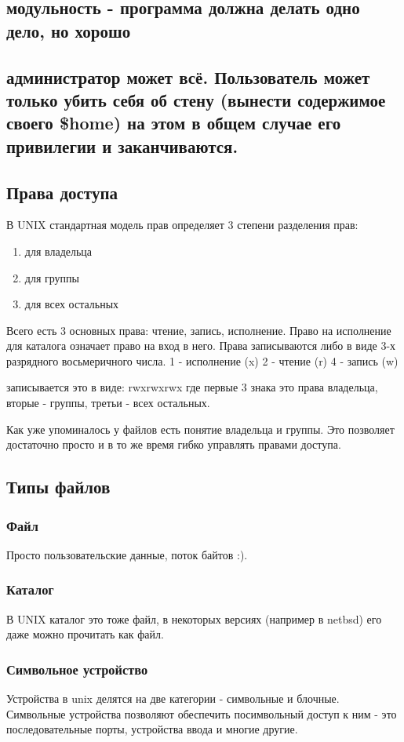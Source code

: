\subsection{модульность - программа должна делать одно дело, но хорошо}
\subsection{администратор может всё. Пользователь может только убить себя об стену (вынести содержимое своего \$home) на этом в общем случае его привилегии и заканчиваются.}
\subsection{Права доступа}
В UNIX стандартная модель прав определяет 3 степени разделения прав:
\begin{enumerate}
\item для владельца
\item для группы
\item для всех остальных
\end{enumerate}
Всего есть 3 основных права: чтение, запись, исполнение. Право на исполнение для каталога означает право на вход в него. Права записываются либо в виде 3-х разрядного восьмеричного числа.
1 - исполнение (x)
2 - чтение (r)
4 - запись (w)

записывается это в виде: rwxrwxrwx где первые 3 знака это права владельца, вторые - группы, третьи - всех остальных.

Как уже упоминалось у файлов есть понятие владельца и группы. Это позволяет достаточно просто и в то же время гибко управлять правами доступа.
\subsection{Типы файлов}
\subsubsection{Файл}
Просто пользовательские данные, поток байтов :).
\subsubsection{Каталог}
В UNIX каталог это тоже файл, в некоторых версиях (например в netbsd) его даже можно прочитать как файл.
\subsubsection{Символьное устройство}
Устройства в unix делятся на две категории - символьные и блочные. Символьные устройства позволяют обеспечить посимвольный доступ к ним - это последовательные порты, устройства ввода и многие другие. 

